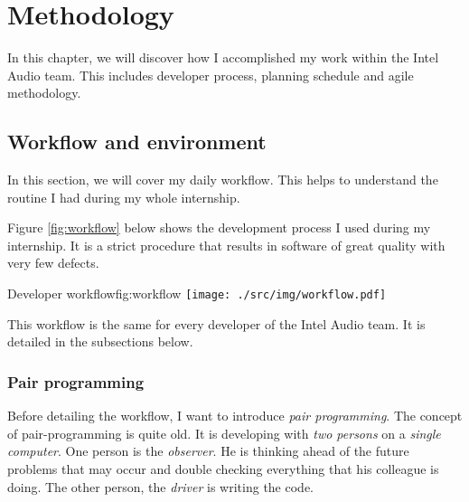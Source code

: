 \chapter{Methodology}\label{chap:organisation}

In this chapter, we will discover how I accomplished my work within the Intel Audio team.
This includes developer process, planning schedule and agile methodology.

\section{Workflow and environment}
In this section, we will cover my daily workflow. This helps
to understand the routine I had during my whole internship.

Figure \ref{fig:workflow} below shows the development process I used during my internship.
It is a strict procedure that results in software of great quality with very few defects.

\begin{figureGraphics}{Developer workflow}{fig:workflow}
    \texttt{[image: ./src/img/workflow.pdf]}
\end{figureGraphics}

This workflow is the same for every developer of the Intel Audio team. It is
detailed in the subsections below.

\subsection{Pair programming}
Before detailing the workflow, I want to introduce \emph{pair programming}.
The concept of pair-programming is quite old. It is developing with \emph{two persons} on a \emph{single computer}.
One person is the \emph{observer}. He is thinking ahead of the future problems that may occur and double checking
everything that his colleague is doing. The other person, the \emph{driver} is writing the code.

